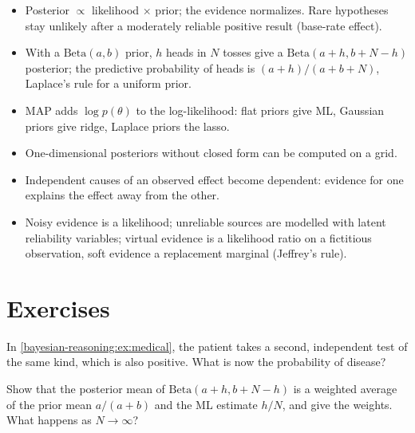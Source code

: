 \begin{notechapter}
\begin{chaptersummary}
\begin{itemize}[nosep]
  \item Posterior $\propto$ likelihood $\times$ prior; the evidence normalizes.
        Rare hypotheses stay unlikely after a moderately reliable positive
        result (base-rate effect).
  \item With a $\mathrm{Beta}(a,b)$ prior, $h$ heads in $N$ tosses give a
        $\mathrm{Beta}(a+h, b+N-h)$ posterior; the predictive probability of heads
        is $(a+h)/(a+b+N)$, Laplace's rule for a uniform prior.
  \item MAP adds $\log p(\theta)$ to the log-likelihood: flat priors give ML,
        Gaussian priors give ridge, Laplace priors the lasso.
  \item One-dimensional posteriors without closed form can be computed on a
        grid.
  \item Independent causes of an observed effect become dependent: evidence for
        one explains the effect away from the other.
  \item Noisy evidence is a likelihood; unreliable sources are modelled with
        latent reliability variables; virtual evidence is a likelihood ratio on
        a fictitious observation, soft evidence a replacement marginal
        (Jeffrey's rule).
\end{itemize}
\end{chaptersummary}

\section*{Exercises}

\begin{exercise}\label{bayesian-reasoning:exr:1}
In \cref{bayesian-reasoning:ex:medical}, the patient takes a second, independent
test of the same kind, which is also positive. What is now the probability of
disease?
\end{exercise}

\begin{exercise}\label{bayesian-reasoning:exr:2}
Show that the posterior mean of $\mathrm{Beta}(a+h, b+N-h)$ is a weighted average of
the prior mean $a/(a+b)$ and the ML estimate $h/N$, and give the weights. What
happens as $N\to\infty$?
\end{exercise}


\end{notechapter}

